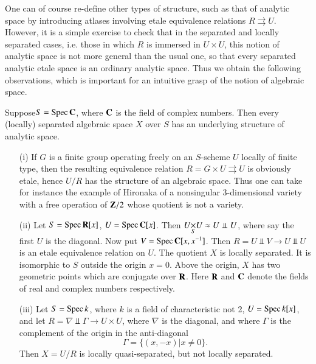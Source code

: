 One can of course re-define other types of structure, such as that of analytic space by introducing atlases involving etale equivalence relations $R\rightrightarrows U$. However, it is a simple exercise to check that in the separated and locally separated cases, i.e. those in which $R$ is immersed in $U\times U$, this notion of analytic space is not more general than the usual one, so that every separated analytic etale space is an ordinary analytic space. Thus we obtain the following observations, which is important for an intuitive grasp of the notion of algebraic space.

\begin{corollary}\label{art02-coro1.6}
Suppose\pageoriginale $S=\operatorname{\mathrm{Spec}} \mathbf{C}$, where $\mathbf{C}$ is the field of complex numbers. Then every (locally) separated algebraic space $X$ over $S$ has an underlying structure of analytic space.
\end{corollary}

\begin{examples}\label{art02-exam1.7}
\begin{itemize}
\item[(i)] If $G$ is a finite group operating freely on an $S$-scheme $U$ locally of finite type, then the resulting equivalence relation $R=G\times U\rightrightarrows U$ is obviously etale, hence $U/R$ has the structure of an algebraic space. Thus one can take for instance the example of Hironaka \cite{art02-key16} of a nonsingular 3-dimensional variety with a free operation of $\mathbf{Z}/2$ whose quotient is not a variety.

\item[(ii)] Let $S=\operatorname{\mathrm{Spec}} \mathbf{R} [x]$, $U=\operatorname{\mathrm{Spec}} \mathbf{C}[x]$. Then $\fprod{U}{U}{S}\approx U\Perp U$, where say the first $U$ is the diagonal. Now put $V=\operatorname{\mathrm{Spec}} \mathbf{C}[x,x^{-1}]$. Then $R=U\Perp V\to U\Perp U$ is an etale equivalence relation on $U$. The quotient $X$ is locally separated. It is isomorphic to $S$ outside the origin $x=0$. Above the origin, $X$ has two geometric points which are conjugate over $\mathbf{R}$. Here $\mathbf{R}$ and $\mathbf{C}$ denote the fields of real and complex numbers respectively.

\item[(iii)] Let $S=\operatorname{\mathrm{Spec}} k$, where $k$ is a field of characteristic not 2, $U=\operatorname{\mathrm{Spec}} k[x]$, and let $R=\nabla \Perp \Gamma\to U\times U$, where $\nabla$ is the diagonal, and where $\Gamma$ is the complement of the origin in the anti-diagonal
$$
\Gamma=\{(x,-x)|x\neq 0\}.
$$
Then $X=U/R$ is locally quasi-separated, but not locally separated.
\end{itemize}
\end{examples}

